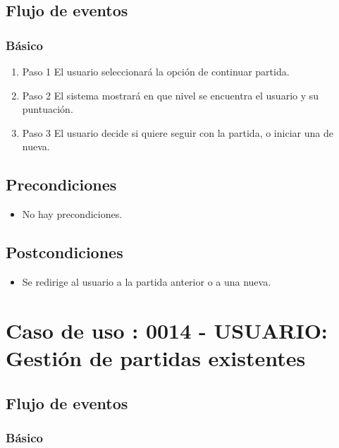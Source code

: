 \subsection{Flujo de eventos}

\subsubsection{Básico}

\begin{enumerate}
\item Paso 1
El usuario seleccionará la opción de continuar partida.
\item Paso 2
El sistema mostrará en que nivel se encuentra el usuario y su puntuación.
\item Paso 3
El usuario decide si quiere seguir con la partida, o iniciar una de nueva.
\end{enumerate}

\subsection{Precondiciones}
\begin{itemize}
\item No hay precondiciones.
\end{itemize}
\subsection{Postcondiciones}
\begin{itemize}
\item Se redirige al usuario a la partida anterior o a una nueva.
\end{itemize}





\section{Caso de uso : 0014 - USUARIO: Gestión de partidas existentes}\label{sec:uc0}

\subsection{Flujo de eventos}

\subsubsection{Básico}

